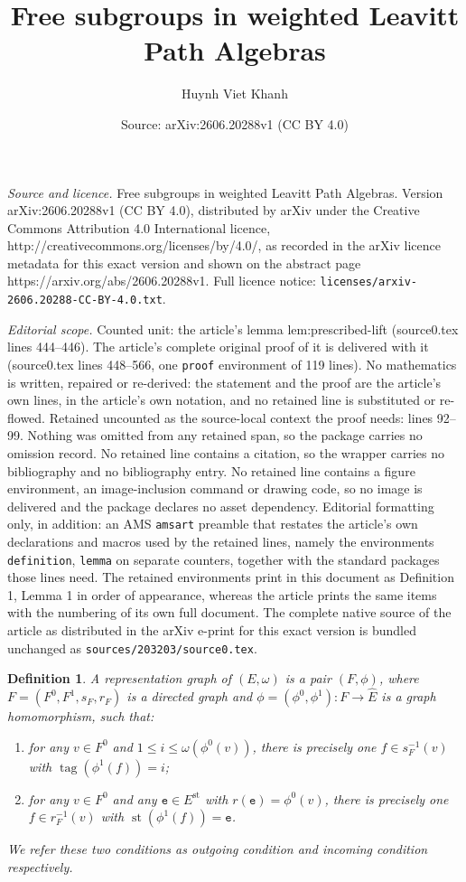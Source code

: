 \documentclass[10pt,a4paper]{amsart}
\title{Free subgroups in weighted Leavitt Path Algebras}
\author{Huynh Viet Khanh}
\date{Source: arXiv:2606.20288v1 (CC BY 4.0)}
\newtheorem{definition}{Definition}
\begin{document}
\maketitle

\noindent\emph{Source and licence.} Free subgroups in weighted Leavitt Path Algebras. Version arXiv:2606.20288v1 (CC BY 4.0), distributed by arXiv under the Creative Commons Attribution 4.0 International licence, http://creativecommons.org/licenses/by/4.0/, as recorded in the arXiv licence metadata for this exact version and shown on the abstract page https://arxiv.org/abs/2606.20288v1. Full licence notice: \texttt{licenses/arxiv-2606.20288-CC-BY-4.0.txt}.\par\smallskip

\noindent\textit{Editorial scope.} Counted unit: the article's lemma lem:prescribed-lift (source0.tex lines 444--446). The article's complete original proof of it is delivered with it (source0.tex lines 448--566, one \texttt{proof} environment of 119 lines). No mathematics is written, repaired or re-derived: the statement and the proof are the article's own lines, in the article's own notation, and no retained line is substituted or re-flowed.  Retained uncounted as the source-local context the proof needs: lines 92--99.  Nothing was omitted from any retained span, so the package carries no omission record.  No retained line contains a citation, so the wrapper carries no bibliography and no bibliography entry.  No retained line contains a figure environment, an image-inclusion command or drawing code, so no image is delivered and the package declares no asset dependency.  Editorial formatting only, in addition: an AMS \texttt{amsart} preamble that restates the article's own declarations and macros used by the retained lines, namely the environments \texttt{definition}, \texttt{lemma} on separate counters, together with the standard packages those lines need.  The retained environments print in this document as Definition 1, Lemma 1 in order of appearance, whereas the article prints the same items with the numbering of its own full document.  The complete native source of the article as distributed in the arXiv e-print for this exact version is bundled unchanged as \texttt{sources/203203/source0.tex}.
\begin{definition}\label{definition_VF}
A \textit{representation graph} of $(E,\omega)$ is a pair $(F,\phi)$, where $F=(F^0,F^1,s_F,r_F)$ is a directed graph and $\phi=(\phi^0,\phi^1):F\to\widehat E$ is a graph homomorphism, such that:
\begin{enumerate}[label=\textup{(\arabic*)}]
\item for any $v\in F^0$ and $1\leq i\leq\omega(\phi^0(v))$, there is precisely one $f\in s_F^{-1}(v)$ with $\operatorname{tag}(\phi^1(f))=i$;
\item for any $v\in F^0$ and any $\mathtt{e}\in E^{\mathrm{st}}$ with $r(\mathtt{e})=\phi^0(v)$, there is precisely one $f\in r_F^{-1}(v)$ with $\operatorname{st}(\phi^1(f))=\mathtt{e}$.
\end{enumerate}
We refer these two conditions as \textit{outgoing condition} and \textit{incoming condition} respectively.
\end{definition}
\end{document}
